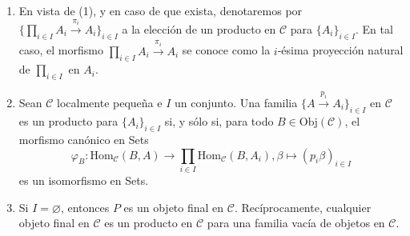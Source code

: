 \documentclass[tesis]{subfiles}
\begin{document}
\begin{Obs}
\begin{enumerate}[label=(\arabic*)]
        \item En vista de (1), y en caso de que exista, denotaremos por $\{\prod_{i\in I}A_i\xrightarrow[]{\pi_i} A_i\}_{i\in I}$ a la elección de un producto en $\mathscr{C}$ para $\{A_i\}_{i\in I}$. En tal caso, el morfismo $\prod_{i\in I}A_i\xrightarrow[]{\pi_i} A_i$ se conoce como la $i$-ésima proyección natural de $\prod_{i\in I}$ en $A_i$.

        \item Sean $\mathscr{C}$ localmente pequeña e $I$ un conjunto. Una familia $\{A\xrightarrow[]{p_i} A_i\}_{i\in I}$ en $\mathscr{C}$ es un producto para $\{A_i\}_{i\in I}$ si, y sólo si, para todo $B\in\text{Obj}(\mathscr{C})$, el morfismo canónico en Sets
            \[
                \varphi_B:\text{Hom}_\mathscr{C}(B,A)\to \prod_{i\in I}\text{Hom}_\mathscr{C}(B,A_i), \beta\mapsto (p_i\beta)_{i\in I}
            \] 
            es un isomorfismo en Sets. 

        \item Si $I=\varnothing$, entonces $P$ es un objeto final en $\mathscr{C}$. Recíprocamente, cualquier objeto final en $\mathscr{C}$ es un producto en $\mathscr{C}$ para una familia vacía de objetos en $\mathscr{C}$.
            
    \end{enumerate}
\end{Obs}
\end{document}
